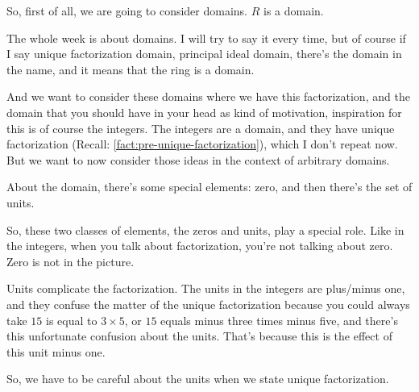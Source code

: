 \begin{speech}[00:06:05 - 00:07:00]
So, first of all, we are going to consider domains.  $R$ is a domain.

The whole week is about domains. I will try to say it every time, but of course if I say unique factorization domain, principal ideal domain, there's the domain in the name, and it means that the ring is a domain.

And we want to consider these domains where we have this factorization, and the domain that you should have in your head as kind of motivation, inspiration for this is of course the integers. The integers are a domain, and they have unique factorization (Recall: \cref{fact:pre-unique-factorization}), which I don't repeat now. But we want to now consider those ideas in the context of arbitrary domains.
\end{speech}

\begin{content}
\end{content}

\begin{speech}[00:07:00 - 00:08:45]
About the domain, there's some special elements: zero,  and then there's the set of units. 

So, these two classes of elements, the zeros and units, play a special role. Like in the integers, when you talk about factorization, you're not talking about zero. Zero is not in the picture.

Units complicate the factorization. The units in the integers are plus/minus one, and they confuse the matter of the unique factorization because you could always take $15$  is equal to $3 \times 5$, or $15$ equals minus three  times minus five, and there's this unfortunate confusion about the units. That's because this is the effect of this unit minus one. 

So, we have to be careful about the units when we state unique factorization.
\end{speech}

